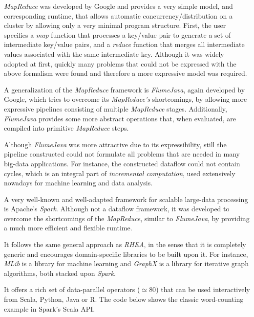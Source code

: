 \documentclass{dithesis}
\begin{document}

\textit{MapReduce} was developed by Google and provides a very simple model, and corresponding runtime, that allows automatic concurrency/distribution on a cluster by allowing only a very minimal program structure. First, the user specifies a \textit{map} function that processes a key/value pair to generate a set of intermediate key/value pairs, and a \textit{reduce} function that merges all intermediate values associated with the same intermediate key. Although it was widely adopted at first, quickly many problems that could not be expressed with the above formalism were found and therefore a more expressive model was required.


A generalization of the \textit{MapReduce} framework is \textit{FlumeJava}, again developed by Google, which tries to overcome its \textit{MapReduce's } shortcomings, by allowing more expressive pipelines consisting of multiple \textit{MapReduce} stages. Additionally, \textit{FlumeJava} provides some more abstract operations that, when evaluated, are compiled into primitive \textit{MapReduce} steps.

Although \textit{FlumeJava} was more attractive due to its expressibility, still the pipeline constructed could not formulate all problems that are needed in many big-data applications. For instance, the constructed dataflow could not contain cycles, which is an integral part of \textit{incremental computation}, used extensively nowadays for machine learning and data analysis.


A very well-known and well-adapted framework for scalable large-data processing is Apache's \textit{Spark}\cite{spark}. Although not a dataflow framework, it was developed to overcome the shortcomings of the \textit{MapReduce}, similar to \textit{FlumeJava}, by providing a much more efficient and flexible runtime.

It follows the same general approach as \textit{RHEA}, in the sense that it is completely generic and encourages domain-specific libraries to be built upon it. For instance, \textit{MLib} is a library for machine learning and \textit{GraphX} is a library for iterative graph algorithms, both stacked upon \textit{Spark}.

It offers a rich set of data-parallel operators ($\simeq 80$) that can be used interactively from Scala, Python, Java or R. The code below shows the classic word-counting example in Spark's Scala API.
\end{document}
